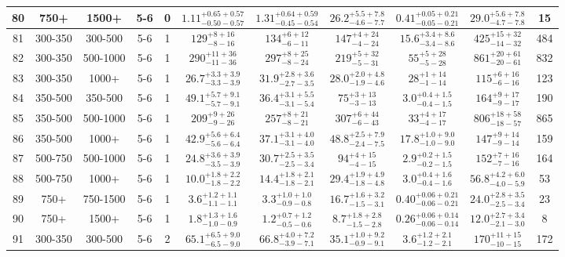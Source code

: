 \documentclass[11pt, oneside]{article}
\begin{document}
\begin{table}
{\begin{tabular}{ |c|c|c|c|c||c|c|c|c||c|c| }
80 & 750+ & 1500+ & 5-6 & 0 & $1.11^{+0.65+0.57}_{-0.50-0.57}$ & $1.31^{+0.64+0.59}_{-0.45-0.54}$ & $26.2^{+5.5+7.8}_{-4.6-7.7}$ & $0.41^{+0.05+0.21}_{-0.05-0.21}$ & $29.0^{+5.6+7.8}_{-4.7-7.8}$ & 15 \\ \hline
81 & 300-350 & 300-500 & 5-6 & 1 & $129^{+ 8+16}_{- 8-16}$ & $134^{+ 6+12}_{- 6-11}$ & $147^{+ 4+24}_{- 4-24}$ & $15.6^{+3.4+8.6}_{-3.4-8.6}$ & $425^{+15+32}_{-14-32}$ & 484 \\ \hline
82 & 300-350 & 500-1000 & 5-6 & 1 & $290^{+11+36}_{-11-36}$ & $297^{+ 8+25}_{- 8-24}$ & $219^{+ 5+32}_{- 5-31}$ & $55^{+ 5+28}_{- 5-28}$ & $861^{+20+61}_{-20-61}$ & 832 \\ \hline
83 & 300-350 & 1000+ & 5-6 & 1 & $26.7^{+3.3+3.9}_{-3.3-3.9}$ & $31.9^{+2.8+3.6}_{-2.7-3.5}$ & $28.0^{+2.0+4.8}_{-1.9-4.6}$ & $28^{+ 1+14}_{- 1-14}$ & $115^{+ 6+16}_{- 6-16}$ & 123 \\ \hline
84 & 350-500 & 350-500 & 5-6 & 1 & $49.1^{+5.7+9.1}_{-5.7-9.1}$ & $36.4^{+3.1+5.5}_{-3.1-5.4}$ & $75^{+ 3+13}_{- 3-13}$ & $3.0^{+0.4+1.5}_{-0.4-1.5}$ & $164^{+ 9+17}_{- 9-17}$ & 190 \\ \hline
85 & 350-500 & 500-1000 & 5-6 & 1 & $209^{+ 9+26}_{- 9-26}$ & $257^{+ 8+21}_{- 8-21}$ & $307^{+ 6+44}_{- 6-43}$ & $33^{+ 4+17}_{- 4-17}$ & $806^{+18+58}_{-18-57}$ & 865 \\ \hline
86 & 350-500 & 1000+ & 5-6 & 1 & $42.9^{+5.6+6.4}_{-5.6-6.4}$ & $37.1^{+3.1+4.0}_{-3.1-4.0}$ & $48.8^{+2.5+7.9}_{-2.4-7.5}$ & $17.8^{+1.0+9.0}_{-1.0-9.0}$ & $147^{+ 9+14}_{- 9-14}$ & 159 \\ \hline
87 & 500-750 & 500-1000 & 5-6 & 1 & $24.8^{+3.6+3.9}_{-3.5-3.9}$ & $30.7^{+2.5+3.5}_{-2.5-3.4}$ & $94^{+ 4+15}_{- 4-15}$ & $2.9^{+0.2+1.5}_{-0.2-1.5}$ & $152^{+ 7+16}_{- 7-16}$ & 164 \\ \hline
88 & 500-750 & 1000+ & 5-6 & 1 & $10.0^{+1.8+2.2}_{-1.8-2.2}$ & $14.4^{+1.8+2.1}_{-1.8-2.1}$ & $29.4^{+1.9+4.9}_{-1.8-4.8}$ & $3.0^{+0.4+1.6}_{-0.4-1.6}$ & $56.8^{+4.2+6.0}_{-4.0-5.9}$ & 53 \\ \hline
89 & 750+ & 750-1500 & 5-6 & 1 & $3.6^{+1.2+1.1}_{-1.1-1.1}$ & $3.3^{+1.0+1.0}_{-0.9-0.8}$ & $16.7^{+1.6+3.2}_{-1.5-3.1}$ & $0.40^{+0.06+0.21}_{-0.06-0.21}$ & $24.0^{+2.8+3.5}_{-2.5-3.4}$ & 23 \\ \hline
90 & 750+ & 1500+ & 5-6 & 1 & $1.8^{+1.3+1.6}_{-1.0-0.9}$ & $1.2^{+0.7+1.2}_{-0.5-0.6}$ & $8.7^{+1.8+2.8}_{-1.5-2.8}$ & $0.26^{+0.06+0.14}_{-0.06-0.14}$ & $12.0^{+2.7+3.4}_{-2.1-3.0}$ & 8 \\ \hline
91 & 300-350 & 300-500 & 5-6 & 2 & $65.1^{+6.5+9.0}_{-6.5-9.0}$ & $66.8^{+4.0+7.2}_{-3.9-7.1}$ & $35.1^{+1.0+9.2}_{-0.9-9.1}$ & $3.6^{+1.2+2.1}_{-1.2-2.1}$ & $170^{+11+15}_{-10-15}$ & 172 \\ \hline

\end{tabular}}
\end{table}
\end{document}
